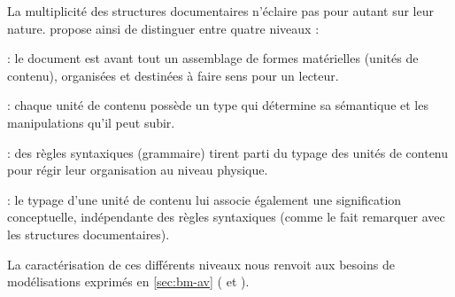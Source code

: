 La multiplicité des structures documentaires n'éclaire pas pour autant sur leur nature.
\cite[p.191-192]{bachimont:icc} propose ainsi de distinguer entre quatre niveaux :
\begin{liste}
 	\item {} : le document est avant tout un assemblage de formes matérielles (unités de contenu), organisées et destinées à faire sens pour un lecteur.

 	\item {} : chaque unité de contenu possède un type qui détermine sa sémantique et les manipulations qu'il peut subir.
 
 	\item {} : des règles syntaxiques (grammaire) tirent parti du typage des unités de contenu pour régir leur organisation au niveau physique. 

 	\item {} : le typage d'une unité de contenu lui associe également une signification conceptuelle, indépendante des règles syntaxiques (comme \citeauthor{Prie2000} le fait remarquer avec les structures documentaires).
\end{liste}


La caractérisation de ces différents niveaux nous renvoit aux besoins de modélisations exprimés en \ref{sec:bm-av} ( et ).






